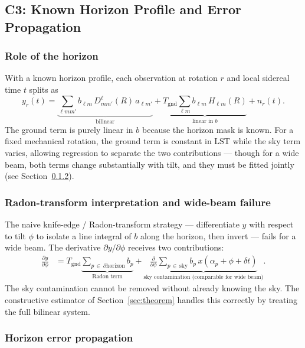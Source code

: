 \documentclass{aastex631}
\newcommand{\blm}{b_{\ell m}}
\newcommand{\Hlm}{H_{\ell m}}
\newcommand{\Dlm}{D^\ell_{mm'}}
\newcommand{\Tgnd}{T_\mathrm{gnd}}
\theoremstyle{plain}
\theoremstyle{remark}
\begin{document}
\subsection{C3: Known Horizon Profile and Error Propagation}
\label{sec:horizon}

\subsubsection{Role of the horizon}

With a known horizon profile, each observation at rotation $r$ and
local sidereal time $t$ splits as
\begin{equation} \label{eq:split}
  y_r(t) =
  \underbrace{\sum_{\ell mm'} \blm\,\Dlm(R)\,a_{\ell m'}}_{\text{bilinear}}
  +
  \underbrace{\Tgnd \sum_{\ell m} \blm\,\Hlm(R)}_{\text{linear in }b}
  + n_r(t).
\end{equation}
The ground term is purely linear in $b$ because the horizon mask is
known.
For a fixed mechanical rotation, the ground term is constant in LST
while the sky term varies, allowing regression to separate the two
contributions --- though for a wide beam, both terms change
substantially with tilt, and they must be fitted jointly (see
Section~\ref{sec:widbeam}).

\subsubsection{Radon-transform interpretation and wide-beam failure}
\label{sec:widbeam}

The naive knife-edge / Radon-transform strategy --- differentiate $y$
with respect to tilt $\phi$ to isolate a line integral of $b$ along
the horizon, then invert --- fails for a wide beam.
The derivative $\partial y/\partial \phi$ receives two contributions:
\begin{align}
  \frac{\partial y}{\partial \phi} &=
  \Tgnd
  \underbrace{\sum_{p\,\in\,\partial\mathrm{horizon}} b_p}_{\text{Radon term}}
  +
  \underbrace{\frac{\partial}{\partial \phi}
    \sum_{p\,\in\,\mathrm{sky}} b_p\,
    x(\alpha_p+\phi+\delta t)}_{\text{sky contamination (comparable for wide beam)}}.
\end{align}
The sky contamination cannot be removed without already knowing the
sky.
The constructive estimator of Section~\ref{sec:theorem} handles this
correctly by treating the full bilinear system.

\subsubsection{Horizon error propagation}
\end{document}
